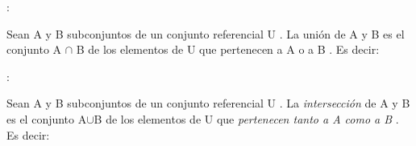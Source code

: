 \documentclass[10pt]{article}
\begin{document}
\begin{defi}[Unión]:

Sean A y B subconjuntos de un conjunto referencial U . La unión
de A y B es el conjunto A $\cap$ B de los elementos de U que pertenecen a A o a B . Es decir:
\begin{center}
\end{center}
\end{defi}
\newpage
\begin{defi}[Intersección]:

Sean A y B subconjuntos de un conjunto referencial U .
La \textit{intersección} de A y B es el conjunto A$\cup$B de los elementos de U que \textit{pertenecen tanto a A como a B} . Es decir:
\begin{center}
\end{center}
\end{defi}
\end{document}
